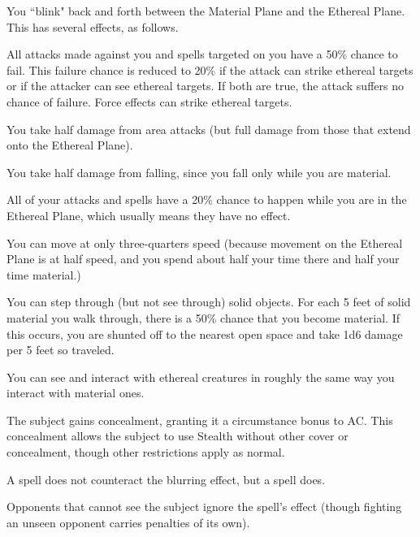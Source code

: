 \spellrng{\rngpers}
\begin{spelleffect}
  You ``blink" back and forth between the Material Plane and the Ethereal Plane. This has several effects, as follows.
  \begin{itemize*}
    \item All attacks made against you and spells targeted on you have a 50\% chance to fail. This failure chance is reduced to 20\% if the attack can strike ethereal targets or if the attacker can see ethereal targets. If both are true, the attack suffers no chance of failure. Force effects can strike ethereal targets.
    \item You take half damage from area attacks (but full damage from those that extend onto the Ethereal Plane).
    \item You take half damage from falling, since you fall only while you are material.
    \item All of your attacks and spells have a 20\% chance to happen while you are in the Ethereal Plane, which usually means they have no effect.
    \item You can move at only three-quarters speed (because movement on the Ethereal Plane is at half speed, and you spend about half your time there and half your time material.)
    \item You can step through (but not see through) solid objects. For each 5 feet of solid material you walk through, there is a 50\% chance that you become material. If this occurs, you are shunted off to the nearest open space and take 1d6 damage per 5 feet so traveled. 
    \item You can see and interact with ethereal creatures in roughly the same way you interact with material ones.
  \end{itemize*}
\end{spelleffect}

\spellrng{\rngclose}
\begin{spelleffect}
  The subject gains concealment, granting it a  circumstance bonus to AC. This concealment allows the subject to use Stealth without other cover or concealment, though other restrictions apply as normal.
\end{spelleffect}
\begin{spellnotes}
  A  spell does not counteract the blurring effect, but a  spell does.
  \par Opponents that cannot see the subject ignore the spell's effect (though fighting an unseen opponent carries penalties of its own).
\end{spellnotes}

